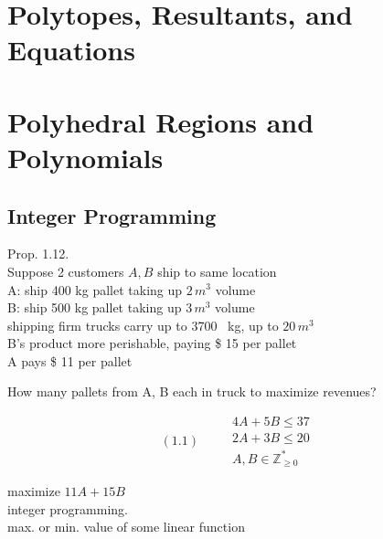 \documentclass[10pt]{amsart}
\begin{document}
\begin{multicols*}{2}
\section{}

\section{}

\section{ Polytopes, Resultants, and Equations }

\section{ Polyhedral Regions and Polynomials }

\subsection{ Integer Programming }

Prop. 1.12. \\

Suppose 2 customers $A, B$ ship to same location \\
\quad A: ship 400 kg pallet taking up $2 \, m^3$ volume \\
\quad B: ship 500 kg pallet taking up $3 \, m^3$ volume \\

shipping firm trucks carry up to 3700 \, kg, up to $20 \, m^3$ \\

B's product more perishable, paying \$ 15 per pallet \\

A pays \$ 11 per pallet

How many pallets from A, B each in truck to maximize revenues?

\begin{equation}
(1.1) \quad \quad \, \begin{gathered}
    4A + 5B \leq 37 \\
    2A  + 3B \leq 20 \\
    A, B \in \mathbb{Z}^*_{ \geq 0 } \end{gathered}
\end{equation}

maximize $11 A + 15 B$ \\

integer programming. \\
max. or min. value of some linear function 


\end{multicols*}
\end{document}

